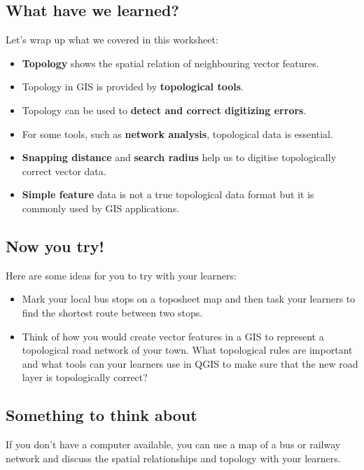 \subsection{What have we learned?}

Let's wrap up what we covered in this worksheet:

\begin{itemize}
\item \textbf{Topology} shows the spatial relation of neighbouring vector features.
\item Topology in GIS is provided by \textbf{topological tools}. 
\item Topology can be used to \textbf{detect and correct digitizing errors}.
\item For some tools, such as \textbf{network analysis}, topological data is
essential.
\item \textbf{Snapping distance} and \textbf{search radius} help us to
digitise topologically correct vector data.
\item \textbf{Simple feature} data is not a true topological data format but
it is commonly used by GIS applications.
\end{itemize}

\subsection{Now you try!}

Here are some ideas for you to try with your learners:

\begin{itemize}
\item Mark your local bus stops on a toposheet map and then task your learners to
find the shortest route between two stops.
\item Think of how you would create vector features in a GIS to represent a
topological road network of your town. What topological rules are important
and what tools can your learners use in QGIS to make sure that the new road
layer is topologically correct?  
\end{itemize}

\subsection{Something to think about}

If you don't have a computer available, you can use a map of a bus or railway
network and discuss the spatial relationships and topology with your
learners.

